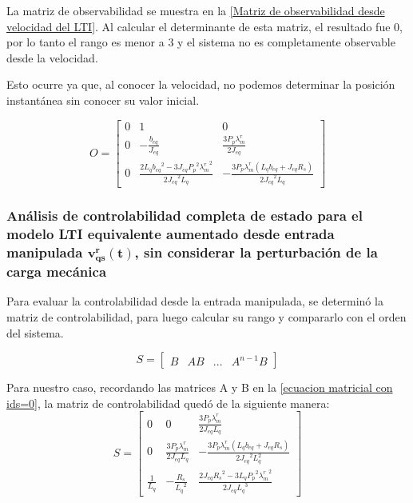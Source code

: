\documentclass[a4paper, 10pt, onecolumn,journal]{ieeeconf}
\begin{document}
La matriz de observabilidad se muestra en la \cref{Matriz de observabilidad desde velocidad del LTI}.
Al calcular el determinante de esta matriz, el resultado fue 0, por lo tanto el rango es menor a 3 y el sistema no es completamente observable desde la velocidad.

Esto ocurre ya que, al conocer la velocidad, no podemos determinar la posición instantánea sin conocer su valor inicial.

\begin{equation}
	O=
	\begin{bmatrix}
		0 & 1 & 0 \\ 
		0 & -\frac{b_{eq}}{J_{eq}} &\frac{3 P_p \lambda^r_m}{2 J_{eq}}\\
		0 & \frac{2 L_q {b_{eq}}^2 - 3 J_{eq} {P_p}^2 {\lambda^r_m}^2} {2 {J_{eq}}^2 L_q} & -\frac{3 P_p \lambda^r_m \left(L_q b_{eq} + J_{eq} R_s \right)}{2 {J_{eq}}^2 L_q}  
	\end{bmatrix}
	\label{Matriz de observabilidad desde velocidad del LTI}
\end{equation}

\subsubsection{\textbf{Análisis de controlabilidad completa de estado para el modelo LTI equivalente aumentado desde entrada manipulada $\mathbf{v^r_{qs}(t)}$, sin considerar la perturbación de la carga mecánica}}
Para evaluar la controlabilidad desde la entrada manipulada, se determinó la matriz de controlabilidad, para luego calcular su rango y compararlo con el orden del sistema.

\begin{equation}
	S=
	\begin{bmatrix}
		B & AB & ... & A^{n-1}B  
	\end{bmatrix}
	\label{Matriz de controlabilidad generica}
\end{equation}

Para nuestro caso, recordando las matrices A y B en la \cref{ecuacion matricial con ids=0}, la matriz de controlabilidad quedó de la siguiente manera:
\begin{equation}
	S=
	\begin{bmatrix}
		0 & 0 & \frac{3 P_p \lambda^r_m}{2 J_{eq} L_q}\\ 
		0 & \frac{3 P_p \lambda^r_m}{2 J_{eq} L_q} & -\frac{3 P_p \lambda^r_m \left(L_q b_{eq} + J_{eq} R_s \right)}{2 {J_{eq}}^2 L_q^2}\\
		\frac{1}{L_q} & -\frac{R_s}{{L_q}^2} & \frac{2 J_{eq} {R_s}^2 - 3 L_{q} {P_p}^2 {\lambda^r_m}^2} {2 J_{eq} {L_q}^3}  
	\end{bmatrix}
	\label{Matriz de controlabilidad del LTI}
\end{equation}
\end{document}
